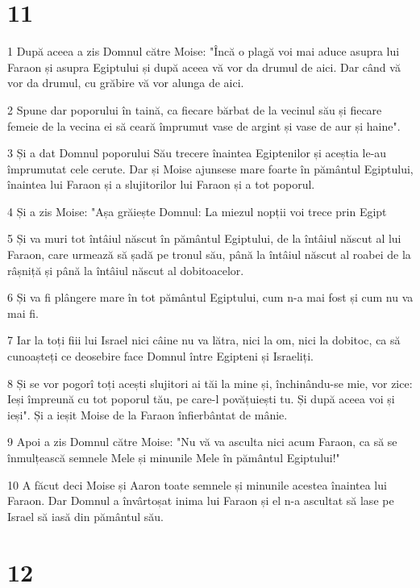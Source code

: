 \chapter{11}

\par 1 După aceea a zis Domnul către Moise: "Încă o plagă voi mai aduce asupra lui Faraon și asupra Egiptului și după aceea vă vor da drumul de aici. Dar când vă vor da drumul, cu grăbire vă vor alunga de aici.
\par 2 Spune dar poporului în taină, ca fiecare bărbat de la vecinul său și fiecare femeie de la vecina ei să ceară împrumut vase de argint și vase de aur și haine".
\par 3 Și a dat Domnul poporului Său trecere înaintea Egiptenilor și aceștia le-au împrumutat cele cerute. Dar și Moise ajunsese mare foarte în pământul Egiptului, înaintea lui Faraon și a slujitorilor lui Faraon și a tot poporul.
\par 4 Și a zis Moise: "Așa grăiește Domnul: La miezul nopții voi trece prin Egipt
\par 5 Și va muri tot întâiul născut în pământul Egiptului, de la întâiul născut al lui Faraon, care urmează să șadă pe tronul său, până la întâiul născut al roabei de la râșniță și până la întâiul născut al dobitoacelor.
\par 6 Și va fi plângere mare în tot pământul Egiptului, cum n-a mai fost și cum nu va mai fi.
\par 7 Iar la toți fiii lui Israel nici câine nu va lătra, nici la om, nici la dobitoc, ca să cunoașteți ce deosebire face Domnul între Egipteni și Israeliți.
\par 8 Și se vor pogorî toți acești slujitori ai tăi la mine și, închinându-se mie, vor zice: Ieși împreună cu tot poporul tău, pe care-l povățuiești tu. Și după aceea voi și ieși". Și a ieșit Moise de la Faraon înfierbântat de mânie.
\par 9 Apoi a zis Domnul către Moise: "Nu vă va asculta nici acum Faraon, ca să se înmulțească semnele Mele și minunile Mele în pământul Egiptului!"
\par 10 A făcut deci Moise și Aaron toate semnele și minunile acestea înaintea lui Faraon. Dar Domnul a învârtoșat inima lui Faraon și el n-a ascultat să lase pe Israel să iasă din pământul său.

\chapter{12}

